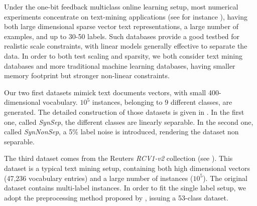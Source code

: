 \documentclass[preprint,12pt,authoryear]{elsarticle}
\begin{document}

Under the one-bit feedback multiclass online learning setup, most numerical experiments concentrate on text-mining applications (see for instance \cite{crammer2013multiclass}), having both large dimensional sparse vector text representations, a large number of examples, and up to 30-50  labels. Such databases provide a good testbed for realistic scale constraints, with linear models generally effective to separate the data. 
In order to both test scaling and sparsity, we both consider text mining databases and more traditional machine learning databases, having smaller memory footprint but stronger non-linear constraints.

Our two first datasets mimick text documents vectors, with small 400-dimensional vocabulary. $10^5$ instances, belonging to 9 different classes, are generated. The detailed construction of those datasets is given in \cite{kakade2008efficient}. In the first one, called  \textit{SynSep}, the different classes are linearly separable. In the second one, called \textit{SynNonSep}, a 5\% label noise is introduced, rendering the dataset non separable.  

The third dataset comes from the Reuters \textit{RCV1-v2} collection (see \cite{David04RCV}). This dataset is a typical  text mining setup, containing both high dimensional vectors (47,236 vocabulary entries) and a large number of instances ($10^5$). 
The original dataset contains multi-label instances.  In order to fit the single label setup, we adopt the preprocessing method proposed by \cite{RB08a}, issuing a 53-class dataset.  





\end{document}
